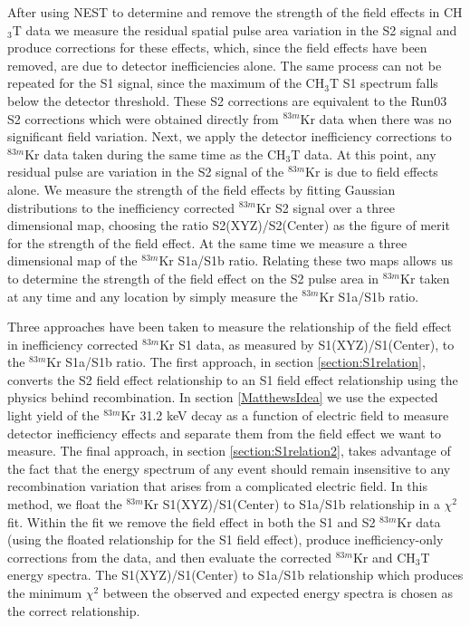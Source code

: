 \documentclass[a4paper,12pt]{article}
\begin{document}
{After using NEST to determine and remove the strength of the field effects in CH$_3$T data we measure the residual spatial pulse area variation in the S2 signal and produce corrections for these effects, which, since the field effects have been removed, are due to detector inefficiencies alone.  The same process can not be repeated for the S1 signal, since the maximum of the CH$_3$T S1 spectrum falls below the detector threshold.  These S2 corrections are equivalent to the Run03 S2 corrections which were obtained directly from $^{83m}$Kr data when there was no significant field variation.  Next, we apply the detector inefficiency corrections to $^{83m}$Kr data taken during the same time as the CH$_3$T data.  At this point, any residual pulse are variation in the S2 signal of the $^{83m}$Kr is due to field effects alone.  We measure the strength of the field effects by fitting Gaussian distributions to the inefficiency corrected $^{83m}$Kr S2 signal over a three dimensional map, choosing the ratio S2(XYZ)/S2(Center) as the figure of merit for the strength of the field effect.  At the same time we measure a three dimensional map of the $^{83m}$Kr S1a/S1b ratio.  Relating these two maps allows us to determine the strength of the field effect on the S2 pulse area in $^{83m}$Kr taken at any time and any location by simply measure the $^{83m}$Kr S1a/S1b ratio. 

Three approaches have been taken to measure the relationship of the field effect in inefficiency corrected $^{83m}$Kr S1 data, as measured by S1(XYZ)/S1(Center), to the $^{83m}$Kr S1a/S1b ratio.  The first approach, in section \ref{section:S1relation}, converts the S2 field effect relationship to an S1 field effect relationship using the physics behind recombination.  In section \ref{MatthewsIdea} we use the expected light yield of the $^{83m}$Kr 31.2 keV decay as a function of electric field to measure detector inefficiency effects and separate them from the field effect we want to measure.  The final approach, in section \ref{section:S1relation2}, takes advantage of the fact that the energy spectrum of any event should remain insensitive to any recombination variation that arises from a complicated electric field.  In this method, we float the $^{83m}$Kr S1(XYZ)/S1(Center) to S1a/S1b relationship in a $\chi^2$ fit.  Within the fit we remove the field effect in both the S1 and S2 $^{83m}$Kr data (using the floated relationship for the S1 field effect), produce inefficiency-only corrections from the data, and then evaluate the corrected $^{83m}$Kr and CH$_3$T energy spectra.  The  S1(XYZ)/S1(Center) to S1a/S1b relationship which produces the minimum $\chi^2$ between the observed and expected energy spectra is chosen as the correct relationship.

}
\end{document}
